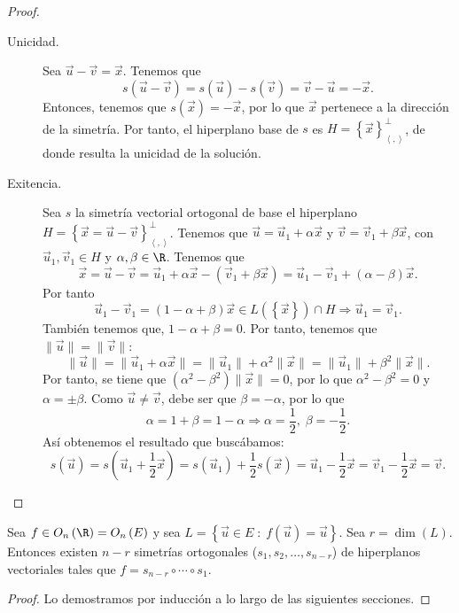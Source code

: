 \begin{proof}
\begin{description}
\item[Unicidad.] Sea $\displaystyle \vec{u}-\vec{v} = \vec{x} $. Tenemos que 
	\[s\left(\vec{u}-\vec{v}\right) = s\left(\vec{u}\right)-s\left(\vec{v}\right) = \vec{v}-\vec{u} = - \vec{x} .\]
	Entonces, tenemos que $\displaystyle s\left(\vec{x}\right) = -\vec{x} $, por lo que $\displaystyle \vec{x} $ pertenece a la dirección de la simetría. Por tanto, el hiperplano base de $\displaystyle s $ es $\displaystyle H = \left\{ \vec{x}\right\} ^{\perp }_{\left\langle ,  \right\rangle } $, de donde resulta la unicidad de la solución. 
\item[Exitencia.] Sea $\displaystyle s $ la simetría vectorial ortogonal de base el hiperplano $\displaystyle H = \left\{ \vec{x} = \vec{u}-\vec{v}\right\} ^{\perp }_{\left\langle ,  \right\rangle } $. Tenemos que $\displaystyle \vec{u} = \vec{u}_{1} + \alpha \vec{x} $ y $\displaystyle \vec{v} = \vec{v}_{1} +\beta \vec{x}$, con $\displaystyle \vec{u}_{1}, \vec{v}_{1} \in H $ y $\displaystyle \alpha, \beta \in \R $.
	Tenemos que
	\[ \vec{x} = \vec{u}-\vec{v} = \vec{u}_{1} +\alpha \vec{x} - \left(\vec{v}_{1} + \beta\vec{x}\right) = \vec{u}_{1}-\vec{v}_{1} + \left(\alpha - \beta \right)\vec{x} .\]
	Por tanto
	\[\vec{u}_{1}-\vec{v}_{1} = \left(1-\alpha+\beta\right)\vec{x} \in L(\left\{ \vec{x}\right\}) \cap H \Rightarrow \vec{u}_{1} = \vec{v}_{1} .\]
	También tenemos que, $\displaystyle 1-\alpha + \beta = 0$. Por tanto, tenemos que $\displaystyle \|\vec{u}\| = \|\vec{v}\| $: 
\[ \|\vec{u}\| = \|\vec{u}_{1}+\alpha\vec{x}\| = \|\vec{u}_{1}\|+\alpha^{2}\|\vec{x}\| = \|\vec{u}_{1}\| + \beta^{2}\|\vec{x}\| .\]
Por tanto, se tiene que $\displaystyle \left(\alpha^{2}-\beta^{2}\right)\|\vec{x}\| = 0 $, por lo que $\displaystyle \alpha^{2} -\beta^{2} = 0 $ y $\displaystyle \alpha = \pm \beta  $. Como $\displaystyle \vec{u} \neq \vec{v} $, debe ser que $\displaystyle \beta = - \alpha  $, por lo que
\[\alpha = 1 + \beta = 1 - \alpha \Rightarrow \alpha = \frac{1}{2}, \; \beta = - \frac{1}{2} .\]
Así obtenemos el resultado que buscábamos: 
\[s\left(\vec{u}\right) = s\left(\vec{u}_{1} + \frac{1}{2}\vec{x}\right) = s\left(\vec{u}_{1} \right)+\frac{1}{2}s\left(\vec{x}\right) = \vec{u}_{1} - \frac{1}{2}\vec{x} = \vec{v}_{1} - \frac{1}{2}\vec{x} = \vec{v} .\]
	\end{description}
\end{proof}
\begin{ftheorem}[]
	\normalfont Sea $\displaystyle f \in O_{n}\left(\R\right) = O_{n}\left(E\right) $ y sea $\displaystyle L = \left\{ \vec{u} \in E \; : \; f\left(\vec{u}\right) = \vec{u}\right\}  $. Sea $\displaystyle r = \dim\left(L\right) $. Entonces existen $\displaystyle n - r $ simetrías ortogonales ($\displaystyle s_{1}, s_{2}, \ldots, s_{n-r} $) de hiperplanos vectoriales tales que $\displaystyle f = s_{n-r}\circ \cdots \circ s_{1} $.
\end{ftheorem}
\begin{proof}
	Lo demostramos por inducción a lo largo de las siguientes secciones.  
		
\end{proof}
